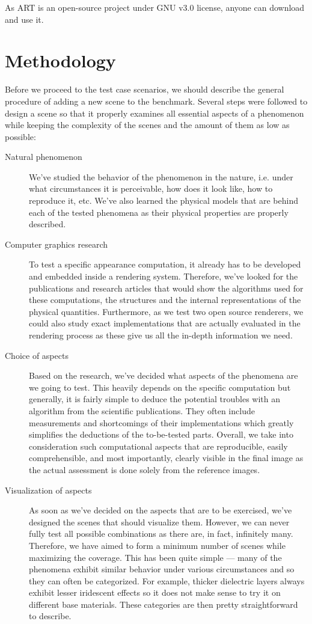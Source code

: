 As ART is an open-source project under GNU v3.0 license, anyone can download and use it.

\section{Methodology}

Before we proceed to the test case scenarios, we should describe the general procedure of adding a new scene to the benchmark. Several steps were followed to design a scene so that it properly examines all essential aspects of a phenomenon while keeping the complexity of the scenes and the amount of them as low as possible:

\begin{description}
	\item[Natural phenomenon] We've studied the behavior of the phenomenon in the nature, i.e. under what circumstances it is perceivable, how does it look like, how to reproduce it, etc. We've also learned the physical models that are behind each of the tested phenomena as their physical properties are properly described.
	\item[Computer graphics research] To test a specific appearance computation, it already has to be developed and embedded inside a rendering system. Therefore, we've looked for the publications and research articles that would show the algorithms used for these computations, the structures and the internal representations of the physical quantities. Furthermore, as we test two open source renderers, we could also study exact implementations that are actually evaluated in the rendering process as these give us all the in-depth information we need.
	\item[Choice of aspects] Based on the research, we've decided what aspects of the phenomena are we going to test. This heavily depends on the specific computation but generally, it is fairly simple to deduce the potential troubles with an algorithm from the scientific publications. They often include measurements and shortcomings of their implementations which greatly simplifies the deductions of the to-be-tested parts. Overall, we take into consideration such computational aspects that are reproducible, easily comprehensible, and most importantly, clearly visible in the final image as the actual assessment is done solely from the reference images. 
	\item[Visualization of aspects] As soon as we've decided on the aspects that are to be exercised, we've designed the scenes that should visualize them. However, we can never fully test all possible combinations as there are, in fact, infinitely many. Therefore, we have aimed to form a minimum number of scenes while maximizing the coverage. This has been quite simple --- many of the phenomena exhibit similar behavior under various circumstances and so they can often be categorized. For example, thicker dielectric layers always exhibit lesser iridescent effects so it does not make sense to try it on different base materials. These categories are then pretty straightforward to describe.

\end{description}
